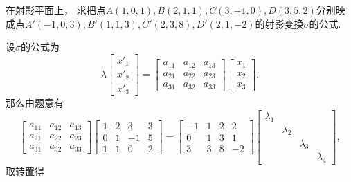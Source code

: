 \begin{example}
在射影平面上，
求把点\(
	A(1,0,1),
	B(2,1,1),
	C(3,-1,0),
	D(3,5,2)
\)分别映成点\(
	A'(-1,0,3), \allowbreak
	B'(1,1,3),
	C'(2,3,8),
	D'(2,1,-2)
\)的射影变换\(\sigma\)的公式.
\begin{solution}
设\(\sigma\)的公式为\begin{equation*}
	\lambda
	\begin{bmatrix}
		x'_1 \\ x'_2 \\ x'_3
	\end{bmatrix}
	= \begin{bmatrix}
		a_{11} & a_{12} & a_{13} \\
		a_{21} & a_{22} & a_{23} \\
		a_{31} & a_{32} & a_{33}
	\end{bmatrix}
	\begin{bmatrix}
		x_1 \\ x_2 \\ x_3
	\end{bmatrix}.
\end{equation*}
那么由题意有\begin{equation*}
	\begin{bmatrix}
		a_{11} & a_{12} & a_{13} \\
		a_{21} & a_{22} & a_{23} \\
		a_{31} & a_{32} & a_{33}
	\end{bmatrix}
	\begin{bmatrix}
		1 & 2 & 3 & 3 \\
		0 & 1 & -1 & 5 \\
		1 & 1 & 0 & 2
	\end{bmatrix}
	= \begin{bmatrix}
		-1 & 1 & 2 & 2 \\
		0 & 1 & 3 & 1 \\
		3 & 3 & 8 & -2
	\end{bmatrix}
	\begin{bmatrix}
		\lambda_1 \\
		& \lambda_2 \\
		&& \lambda_3 \\
		&&& \lambda_4
	\end{bmatrix},
\end{equation*}
取转置得\begin{equation*}

\end{equation*}
\end{solution}
\end{example}
